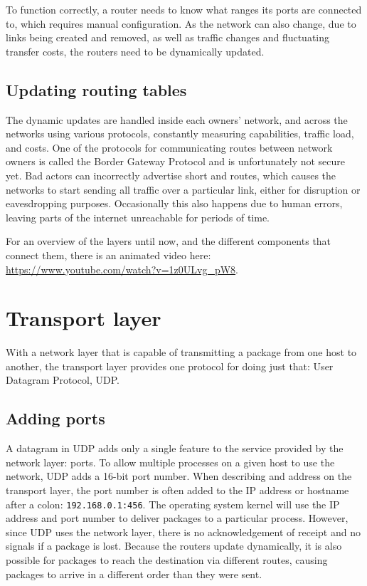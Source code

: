 To function correctly, a router needs to know what ranges its ports are connected to, which requires manual configuration. As the network can also change, due to links being created and removed, as well as traffic changes and fluctuating transfer costs, the routers need to be dynamically updated.

\subsection{Updating routing tables}
The dynamic updates are handled inside each owners’ network, and across the networks using various protocols, constantly measuring capabilities, traffic load, and costs. One of the protocols for communicating routes between network owners is called the Border Gateway Protocol and is unfortunately not secure yet. Bad actors can incorrectly advertise short and routes, which causes the networks to start sending all traffic over a particular link, either for disruption or eavesdropping purposes. Occasionally this also happens due to human errors, leaving parts of the internet unreachable for periods of time.

For an overview of the layers until now, and the different components that connect them, there is an animated video here: \url{https://www.youtube.com/watch?v=1z0ULvg_pW8}.

\section{Transport layer}
With a network layer that is capable of transmitting a package from one host to another, the transport layer provides one protocol for doing just that: User Datagram Protocol, UDP.

\subsection{Adding ports}
A datagram in UDP adds only a single feature to the service provided by the network layer: ports. To allow multiple processes on a given host to use the network, UDP adds a 16-bit port number. When describing and address on the transport layer, the port number is often added to the IP address or hostname after a colon: \texttt{192.168.0.1:456}. The operating system kernel will use the IP address and port number to deliver packages to a particular process. However, since UDP uses the network layer, there is no acknowledgement of receipt and no signals if a package is lost. Because the routers update dynamically, it is also possible for packages to reach the destination via different routes, causing packages to arrive in a different order than they were sent.

